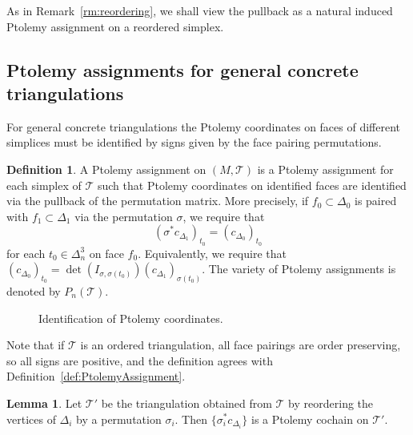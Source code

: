 \documentclass[12pt]{amsart}
\theoremstyle{definition}
\newtheorem{lemma}[theorem]{Lemma}
\newtheorem{definition}[theorem]{Definition}
\numberwithin{equation}{section}
\def\T{\mathcal{T}}
\begin{document}
As in Remark~\ref{rm:reordering}, we shall view the pullback as a natural induced Ptolemy assignment on a reordered simplex.

\subsection{Ptolemy assignments for general concrete triangulations}
\label{sec:OrderAgnosticPtolemy}


For general concrete triangulations the Ptolemy coordinates on faces of different simplices must be identified by signs given by the face pairing permutations.
\begin{definition}\label{def:PtolemyAssignmentGeneral}
A Ptolemy assignment on $(M,\T)$ is a Ptolemy assignment for each simplex of $\T$ such that Ptolemy coordinates on identified faces are identified via the pullback of the permutation matrix. More precisely, if $f_0\subset\Delta_0$ is paired with $f_1\subset\Delta_1$ via the permutation $\sigma$, we require that 
\begin{equation}
(\sigma^*c_{\Delta_1})_{t_0}= (c_{\Delta_0})_{t_0}
\end{equation}
for each $t_0\in\Delta_n^3$ on face $f_0$. Equivalently, we require that $(c_{\Delta_0})_{t_0} = \det(I_{\sigma,\sigma(t_0)}) (c_{\Delta_1})_{\sigma(t_0)}$.
The variety of Ptolemy assignments is denoted by $P_n(\T)$.
\end{definition}

\begin{figure}[htb]
\begin{center}
 
\end{center}
\caption{Identification of Ptolemy coordinates.}\label{fig:PtolemyIdentification}
\end{figure}

Note that if $\T$ is an ordered triangulation, all face pairings are order preserving, so all signs are positive, and the definition agrees with Definition~\ref{def:PtolemyAssignment}.

\begin{lemma}\label{lemma:reorderingPtolemys}
Let $\T'$ be the triangulation obtained from $\T$ by reordering the vertices of $\Delta_i$ by a permutation $\sigma_i$.
Then $\{\sigma_i^*c_{\Delta_i}\}$ is a Ptolemy cochain on $\T'$.
\end{lemma}
\end{document}
